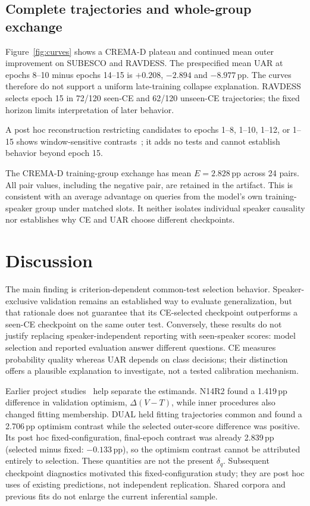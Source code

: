 \documentclass[letterpaper]{article}
\begin{document}
\subsection{Complete trajectories and whole-group exchange}
Figure~\ref{fig:curves} shows a CREMA-D plateau and continued mean outer improvement on SUBESCO and RAVDESS. The prespecified mean UAR at epochs 8--10 minus epochs 14--15 is $+0.208$, $-2.894$ and $-8.977$\,pp. The curves therefore do not support a uniform late-training collapse explanation. RAVDESS selects epoch 15 in 72/120 seen-CE and 62/120 unseen-CE trajectories; the fixed horizon limits interpretation of later behavior.

A post hoc reconstruction restricting candidates to epochs 1--8, 1--10, 1--12, or 1--15 shows window-sensitive contrasts~\cite{artifact}; it adds no tests and cannot establish behavior beyond epoch 15.

The CREMA-D training-group exchange has mean $E=2.828$\,pp across 24 pairs. All pair values, including the negative pair, are retained in the artifact. This is consistent with an average advantage on queries from the model's own training-speaker group under matched slots. It neither isolates individual speaker causality nor establishes why CE and UAR choose different checkpoints.

\section{Discussion}
The main finding is criterion-dependent common-test selection behavior. Speaker-exclusive validation remains an established way to evaluate generalization, but that rationale does not guarantee that its CE-selected checkpoint outperforms a seen-CE checkpoint on the same outer test. Conversely, these results do not justify replacing speaker-independent reporting with seen-speaker scores: model selection and reported evaluation answer different questions. CE measures probability quality whereas UAR depends on class decisions; their distinction offers a plausible explanation to investigate, not a tested calibration mechanism.

Earlier project studies~\cite{artifact} help separate the estimands. N14R2 found a 1.419\,pp difference in validation optimism, $\Delta(V-T)$, while inner procedures also changed fitting membership. DUAL held fitting trajectories common and found a 2.706\,pp optimism contrast while the selected outer-score difference was positive. Its post hoc fixed-configuration, final-epoch contrast was already 2.839\,pp (selected minus fixed: $-0.133$\,pp), so the optimism contrast cannot be attributed entirely to selection. These quantities are not the present $\delta_q$. Subsequent checkpoint diagnostics motivated this fixed-configuration study; they are post hoc uses of existing predictions, not independent replication. Shared corpora and previous fits do not enlarge the current inferential sample.
\end{document}
